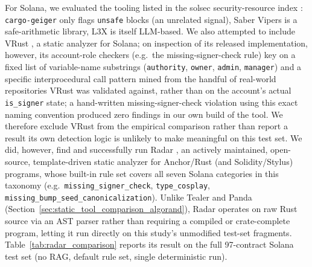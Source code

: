 \documentclass[lettersize,journal]{IEEEtran}
\begin{document}
For Solana, we evaluated the tooling listed in the solsec security-resource index
\cite{solsec}: \texttt{cargo-geiger} only flags \texttt{unsafe} blocks (an unrelated signal), Saber
Vipers is a safe-arithmetic library, L3X is itself LLM-based. We also attempted to include VRust
\cite{vrust2022}, a static analyzer for Solana; on inspection of its released
implementation, however, its account-role checkers (e.g.\ the missing-signer-check rule) key on a
fixed list of variable-name substrings (\texttt{authority}, \texttt{owner}, \texttt{admin},
\texttt{manager}) and a specific interprocedural call pattern mined from the handful of real-world
repositories VRust was validated against, rather than on the account's actual \texttt{is\_signer}
state; a hand-written missing-signer-check violation using this exact naming convention produced
zero findings in our own build of the tool. We therefore exclude VRust from the empirical comparison
rather than report a result its own detection logic is unlikely to make meaningful on this test set.
We did, however, find and successfully run
Radar \cite{radar}, an actively maintained, open-source, template-driven static analyzer for
Anchor/Rust (and Solidity/Stylus) programs, whose built-in rule set covers all seven Solana
categories in this taxonomy (e.g.\ \texttt{missing\_signer\_check}, \texttt{type\_cosplay},
\texttt{missing\_bump\_seed\_canonicalization}). Unlike Tealer and Panda
(Section~\ref{sec:static_tool_comparison_algorand}), Radar operates on raw Rust source via an AST
parser rather than requiring a compiled or crate-complete program, letting it run directly on this
study's unmodified test-set fragments. Table~\ref{tab:radar_comparison} reports its result on the
full 97-contract Solana test set (no RAG, default rule set, single deterministic run).

\begin{table}[t]
\centering
\caption{Radar (existing static analyzer) vs.\ LLM-based baselines, Solana, no RAG, 97-contract test
set. Radar is deterministic (single run); LLM rows are mean $\pm$ std over 5 seeded samples.}
\label{tab:radar_comparison}
\end{table}
\end{document}
